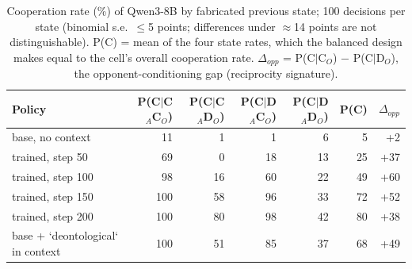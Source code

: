 \begin{table}[t]
\centering
\caption{Cooperation rate (\%) of Qwen3-8B by fabricated previous state; 100 decisions per state (binomial s.e.\ $\leq$5 points; differences under $\approx$14 points are not distinguishable). P(C) = mean of the four state rates, which the balanced design makes equal to the cell's overall cooperation rate. $\Delta_{opp}$ = P(C$\mid$C$_O$) $-$ P(C$\mid$D$_O$), the opponent-conditioning gap (reciprocity signature).}
\label{tab:post-training-qwen3_8b_sdpo_pd_deon_tft_200_seed1}
\small
\setlength{\tabcolsep}{3.5pt}
\begin{tabular}{lrrrrrr}
\toprule
Policy & P(C$\mid$C$_A$C$_O$) & P(C$\mid$C$_A$D$_O$) & P(C$\mid$D$_A$C$_O$) & P(C$\mid$D$_A$D$_O$) & P(C) & $\Delta_{opp}$ \\
\midrule
base, no context & 11 & 1 & 1 & 6 & 5 & +2 \\
trained, step 50 & 69 & 0 & 18 & 13 & 25 & +37 \\
trained, step 100 & 98 & 16 & 60 & 22 & 49 & +60 \\
trained, step 150 & 100 & 58 & 96 & 33 & 72 & +52 \\
trained, step 200 & 100 & 80 & 98 & 42 & 80 & +38 \\
base + `deontological` in context & 100 & 51 & 85 & 37 & 68 & +49 \\
\bottomrule
\end{tabular}
\end{table}
